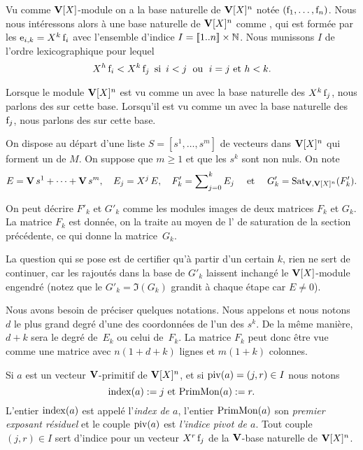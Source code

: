  
Vu comme $\mathbf{V}[X]$-module on a la base naturelle de   $\mathbf{V}[X]^n$
notée $(\mathrm{f}_1,\dots,\mathrm{f}_n)$.
Nous nous intéressons alors à une base naturelle de  $\mathbf{V}[X]^n$ comme \Vmo, qui est formée par les $\mathrm{e}_{i,k}=X^k\,\mathrm{f}_i$ avec l'ensemble d'indice $I=[ \negthinspace [1..n] \negthinspace ]\times \mathbb{N}$.
Nous munissons $I$ de l'ordre lexicographique pour lequel  
 $$
X^h\, \mathrm{f}_i < X^k\,\mathrm{f}_j \,\hbox{ si }\, i<j \;\hbox{ ou } \;i=j \hbox{ et } h<k.
 $$

Lorsque le module $\mathbf{V}[X]^{n}$ est vu comme un \Vmo avec la base naturelle des $X^k\,\mathrm{f}_j$, nous parlons  des \gui{\coos} sur cette base.
Lorsqu'il est vu comme un \VXmo  avec la base naturelle des~$\mathrm{f}_j$,
nous parlons  des \gui{\coes} sur cette base.

On dispose au départ d'une liste $S=[s^1,\dots,s^m]$ de vecteurs dans 
 $\mathbf{V}[X]^n$ qui forment un \sgr de $M$. 
 On suppose \spdg que $m\geq 1$ et que les $s^k$ sont non nuls.
On note 
$$ 
E=\mathbf{V}\,s^1+\cdots+\mathbf{V}\,s^m,\quad E_j=X^j\,E,\quad F'_k=\sum\nolimits_{j=0}^kE_j \quad\hbox{ et }\quad G'_k=\mathrm{Sat}_{\mathbf{V},\mathbf{V}[X]^n}(F'_k).
$$

On peut décrire $F'_k$ et $G'_k$ comme les modules images de deux matrices
$F_k$ et $G_k$. La matrice $F_k$ est donnée, on la traite au moyen de l'\algo
de saturation de la section précédente, ce qui donne la matrice~$G_k$. 

La question qui se pose est de certifier qu'à partir d'un certain $k$,
rien ne sert de continuer, car les \elts rajoutés dans la base de $G'_k$ 
 laissent inchangé le $\mathbf{V}[X]$-module engendré (notez que le \Vmo $G'_k=\Im(G_k)$ grandit à chaque étape car $E\neq 0$).
 
\medskip Nous avons besoin de préciser quelques notations. 
Nous appelons  et nous notons~$d$ le plus grand degré d'une des coordonnées de l'un des $s^{k}$. 
De la m\^eme manière, $d+k$ sera le degré de~$E_k$ ou celui de~$F_k$. La matrice $F_k$ peut donc \^etre vue comme une matrice
avec $n(1+d+k)$ lignes et $m(1+k)$ colonnes.
 
Si $a$ est un vecteur $\mathbf{V}$-primitif de $\mathbf{V}[X]^n$, et si $\mathrm{piv}(a)=(j,r)\in I$ nous notons 
$$
\mathrm{index}(a) := j \hbox{ et } \mathrm{PrimMon}(a) :=r.
$$
L'entier $\mathrm{index}(a)$ est appelé l'\textsl{index de $a$},  l'entier $\mathrm{PrimMon}(a)$
son \textsl{premier exposant résiduel} et le couple  $\mathrm{piv}(a)$ est \textsl{l'indice pivot de $a$}. Tout couple $(j,r)\in I$ sert d'indice pour un vecteur  $X^{r}\,\mathrm{f}_{j}$ de la $\mathbf{V}$-base naturelle de $\mathbf{V}[X]^n$. 


